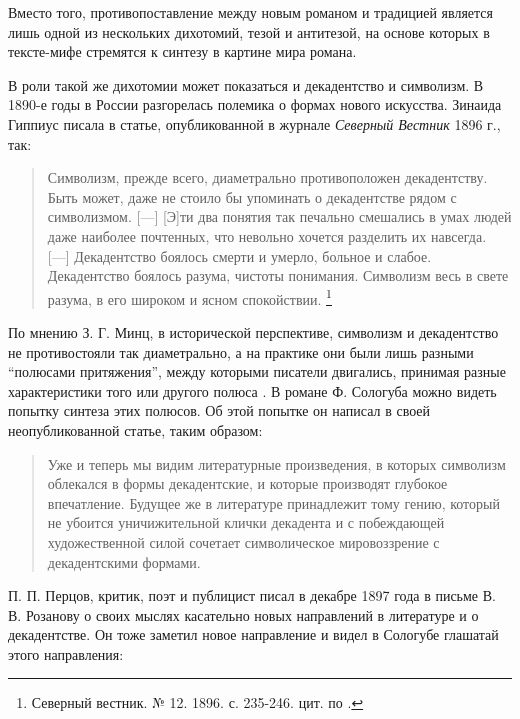 \documentclass[12pt,a4paper]{article}
\begin{document}
Вместо того, противопоставление между новым романом и традицией является лишь одной из нескольких дихотомий, тезой и антитезой, на основе которых в тексте-мифе стремятся к синтезу в картине мира романа.

В роли такой же дихотомии может показаться и декадентство и символизм. В 1890-е годы в России разгорелась полемика о формах нового искусства. Зинаида Гиппиус писала в статье, опубликованной в журнале \emph{Северный Вестник} 1896 г., так: 

\begin{quote}
Символизм, прежде всего, диаметрально противоположен декадентству. Быть может, даже не стоило бы упоминать о декадентстве рядом с символизмом. [---] [Э]ти два понятия так печально смешались в умах людей даже наиболее почтенных, что невольно хочется разделить их навсегда. [---] Декадентство боялось смерти и умерло, больное и слабое. Декадентство боялось разума, чистоты понимания. Символизм весь в свете разума, в его широком и ясном спокойствии. \footnote{Северный вестник. № 12. 1896. с. 235-246. цит. по \cite[150]{pavlova2007}.}

% 
% 
\end{quote}

По мнению З. Г. Минц, в исторической перспективе, символизм и декадентство не противостояли так диаметрально, а на практике они были лишь разными \enquote{полюсами притяжения}, между которыми писатели двигались, принимая разные характеристики того или другого полюса \parencite[62]{mints2004}. В романе Ф. Сологуба можно видеть попытку синтеза этих полюсов. Об этой попытке он написал в своей неопубликованной статье, таким образом:

\begin{quote}
Уже и теперь мы видим литературные произведения, в которых символизм облекался в формы декадентские, и которые производят глубокое впечатление. Будущее же в литературе принадлежит тому гению, который не убоится уничижительной клички декадента и с побеждающей художественной силой сочетает символическое мировоззрение с декадентскими формами.

\parencite[501.]{ref:sologub2007}
\end{quote}

П. П. Перцов, критик, поэт и публицист писал в декабре 1897 года в письме В. В. Розанову о своих мыслях касательно новых направлений в литературе и о декадентстве. Он тоже заметил новое направление и видел в Сологубе глашатай этого направления: 
\end{document}
